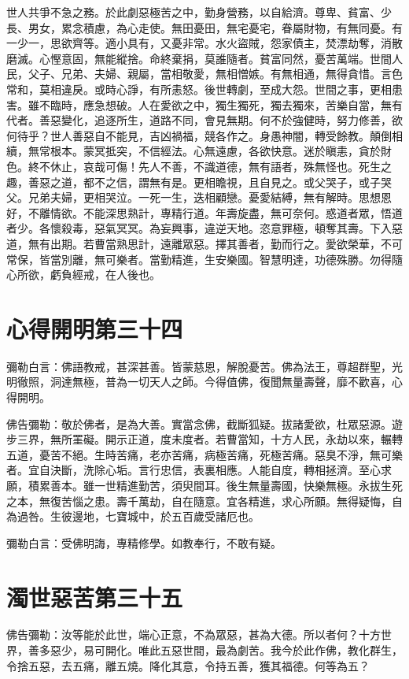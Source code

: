 \documentclass{zhvt-classic}
\begin{document}
世人共爭不急之務。於此劇惡極苦之中，勤身營務，以自給濟。尊卑、貧富、少長、男女，累念積慮，為心走使。無田憂田，無宅憂宅，眷屬財物，有無同憂。有一少一，思欲齊等。適小具有，又憂非常。水火盜賊，怨家債主，焚漂劫奪，消散磨滅。心慳意固，無能縱捨。命終棄捐，莫誰隨者。貧富同然，憂苦萬端。世間人民，父子、兄弟、夫婦、親屬，當相敬愛，無相憎嫉。有無相通，無得貪惜。言色常和，莫相違戾。或時心諍，有所恚怒。後世轉劇，至成大怨。世間之事，更相患害。雖不臨時，應急想破。人在愛欲之中，獨生獨死，獨去獨來，苦樂自當，無有代者。善惡變化，追逐所生，道路不同，會見無期。何不於強健時，努力修善，欲何待乎？世人善惡自不能見，吉凶禍福，競各作之。身愚神闇，轉受餘教。顛倒相續，無常根本。蒙冥抵突，不信經法。心無遠慮，各欲快意。迷於瞋恚，貪於財色。終不休止，哀哉可傷！先人不善，不識道德，無有語者，殊無怪也。死生之趣，善惡之道，都不之信，謂無有是。更相瞻視，且自見之。或父哭子，或子哭父。兄弟夫婦，更相哭泣。一死一生，迭相顧戀。憂愛結縛，無有解時。思想恩好，不離情欲。不能深思熟計，專精行道。年壽旋盡，無可奈何。惑道者眾，悟道者少。各懷殺毒，惡氣冥冥。為妄興事，違逆天地。恣意罪極，頓奪其壽。下入惡道，無有出期。若曹當熟思計，遠離眾惡。擇其善者，勤而行之。愛欲榮華，不可常保，皆當別離，無可樂者。當勤精進，生安樂國。智慧明達，功德殊勝。勿得隨心所欲，虧負經戒，在人後也。

\chapter*{心得開明第三十四}

彌勒白言：佛語教戒，甚深甚善。皆蒙慈恩，解脫憂苦。佛為法王，尊超群聖，光明徹照，洞達無極，普為一切天人之師。今得值佛，復聞無量壽聲，靡不歡喜，心得開明。

佛告彌勒：敬於佛者，是為大善。實當念佛，截斷狐疑。拔諸愛欲，杜眾惡源。遊步三界，無所罣礙。開示正道，度未度者。若曹當知，十方人民，永劫以來，輾轉五道，憂苦不絕。生時苦痛，老亦苦痛，病極苦痛，死極苦痛。惡臭不淨，無可樂者。宜自決斷，洗除心垢。言行忠信，表裏相應。人能自度，轉相拯濟。至心求願，積累善本。雖一世精進勤苦，須臾間耳。後生無量壽國，快樂無極。永拔生死之本，無復苦惱之患。壽千萬劫，自在隨意。宜各精進，求心所願。無得疑悔，自為過咎。生彼邊地，七寶城中，於五百歲受諸厄也。

彌勒白言：受佛明誨，專精修學。如教奉行，不敢有疑。

\chapter*{濁世惡苦第三十五}

佛告彌勒：汝等能於此世，端心正意，不為眾惡，甚為大德。所以者何？十方世界，善多惡少，易可開化。唯此五惡世間，最為劇苦。我今於此作佛，教化群生，令捨五惡，去五痛，離五燒。降化其意，令持五善，獲其福德。何等為五？
\end{document}
